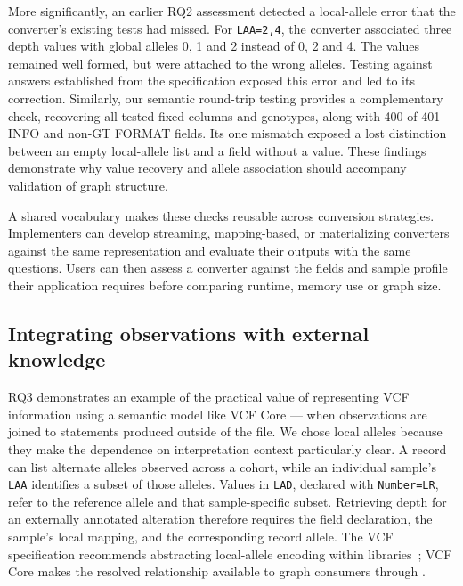 More significantly, an earlier RQ2 assessment detected a local-allele error that the converter's existing tests had missed.
For \texttt{LAA=2,4}, the converter associated three depth values with global alleles 0, 1 and 2 instead of 0, 2 and 4.
The values remained well formed, but were attached to the wrong alleles.
Testing against answers established from the specification exposed this error and led to its correction.
Similarly, our semantic round-trip testing provides a complementary check, recovering all tested fixed columns and genotypes, along with 400 of 401 INFO and non-GT FORMAT fields.
Its one mismatch exposed a lost distinction between an empty local-allele list and a field without a value.
These findings demonstrate why value recovery and allele association should accompany validation of graph structure.

A shared vocabulary makes these checks reusable across conversion strategies.
Implementers can develop streaming, mapping-based, or materializing converters~\cite{penha2017vcf2rdf,mitsuhashi2022togovar,larmande2025agrold,garrison2022vcflib} against the same representation and evaluate their outputs with the same questions.
Users can then assess a converter against the fields and sample profile their application requires before comparing runtime, memory use or graph size.

\subsection{Integrating observations with external knowledge}

RQ3 demonstrates an example of the practical value of representing VCF information using a semantic model like VCF Core --- when observations are joined to statements produced outside of the file.
We chose local alleles because they make the dependence on interpretation context particularly clear.
A record can list alternate alleles observed across a cohort, while an individual sample's \texttt{LAA} identifies a subset of those alleles.
Values in \texttt{LAD}, declared with \texttt{Number=LR}, refer to the reference allele and that sample-specific subset.
Retrieving depth for an externally annotated alteration therefore requires the field declaration, the sample's local mapping, and the corresponding record allele.
The VCF specification recommends abstracting local-allele encoding within libraries~\cite{vcf45}; VCF Core makes the resolved relationship available to graph consumers through .

